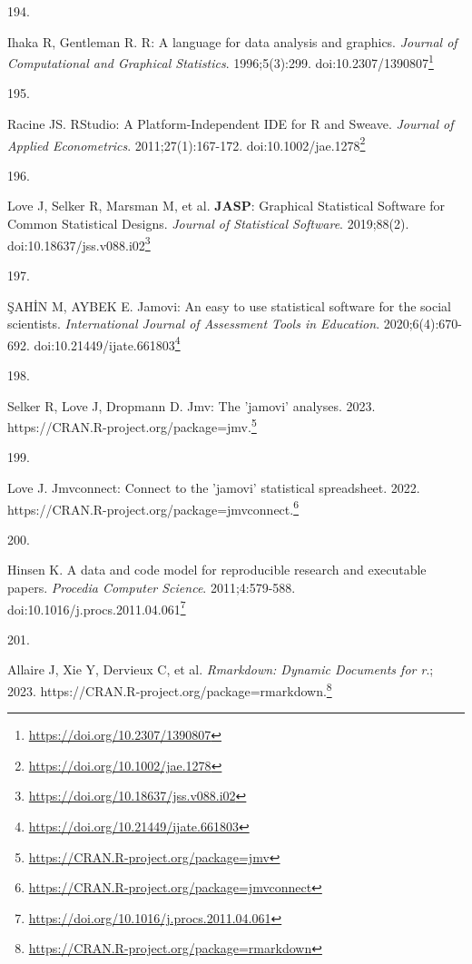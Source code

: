 \documentclass[
  a4paper,
]{book}
\newlength{\cslhangindent}
\newlength{\csllabelwidth}
\newlength{\cslentryspacingunit} %
\newenvironment{CSLReferences}[2] %
 {%
  \setlength{\parindent}{0pt}
  \ifodd #1
  \let\oldpar\par
  \def\par{\hangindent=\cslhangindent\oldpar}
  \fi
  \setlength{\parskip}{#2\cslentryspacingunit}
 }%
 {}
\newcommand{\CSLLeftMargin}[1]{\parbox[t]{\csllabelwidth}{#1}}
\newcommand{\CSLRightInline}[1]{\parbox[t]{\linewidth - \csllabelwidth}{#1}\break}
\renewcommand{\href}[2]{#2\footnote{\url{#1}}}
\begin{document}
\begin{CSLReferences}{0}{0}
\leavevmode{}%
\CSLLeftMargin{194. }%
\CSLRightInline{Ihaka R, Gentleman R. R: A language for data analysis and graphics. \emph{Journal of Computational and Graphical Statistics}. 1996;5(3):299. doi:\href{https://doi.org/10.2307/1390807}{10.2307/1390807}}

\leavevmode{}%
\CSLLeftMargin{195. }%
\CSLRightInline{Racine JS. RStudio: A Platform{-}Independent IDE for R and Sweave. \emph{Journal of Applied Econometrics}. 2011;27(1):167-172. doi:\href{https://doi.org/10.1002/jae.1278}{10.1002/jae.1278}}

\leavevmode{}%
\CSLLeftMargin{196. }%
\CSLRightInline{Love J, Selker R, Marsman M, et al. {\textbf{JASP}}: Graphical Statistical Software for Common Statistical Designs. \emph{Journal of Statistical Software}. 2019;88(2). doi:\href{https://doi.org/10.18637/jss.v088.i02}{10.18637/jss.v088.i02}}

\leavevmode{}%
\CSLLeftMargin{197. }%
\CSLRightInline{ŞAHİN M, AYBEK E. Jamovi: An easy to use statistical software for the social scientists. \emph{International Journal of Assessment Tools in Education}. 2020;6(4):670-692. doi:\href{https://doi.org/10.21449/ijate.661803}{10.21449/ijate.661803}}

\leavevmode{}%
\CSLLeftMargin{198. }%
\CSLRightInline{Selker R, Love J, Dropmann D. Jmv: The 'jamovi' analyses. 2023. \href{https://CRAN.R-project.org/package=jmv}{https://CRAN.R-project.org/package=jmv.}}

\leavevmode{}%
\CSLLeftMargin{199. }%
\CSLRightInline{Love J. Jmvconnect: Connect to the 'jamovi' statistical spreadsheet. 2022. \href{https://CRAN.R-project.org/package=jmvconnect}{https://CRAN.R-project.org/package=jmvconnect.}}

\leavevmode{}%
\CSLLeftMargin{200. }%
\CSLRightInline{Hinsen K. A data and code model for reproducible research and executable papers. \emph{Procedia Computer Science}. 2011;4:579-588. doi:\href{https://doi.org/10.1016/j.procs.2011.04.061}{10.1016/j.procs.2011.04.061}}

\leavevmode{}%
\CSLLeftMargin{201. }%
\CSLRightInline{Allaire J, Xie Y, Dervieux C, et al. \emph{Rmarkdown: Dynamic Documents for r}.; 2023. \href{https://CRAN.R-project.org/package=rmarkdown}{https://CRAN.R-project.org/package=rmarkdown.}}


\end{CSLReferences}
\end{document}
